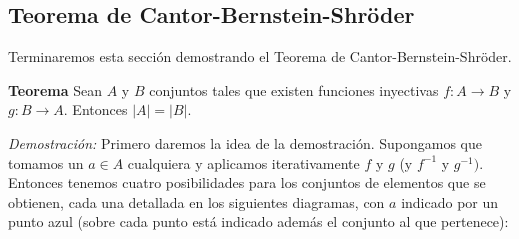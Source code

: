 \subsection*{Teorema de Cantor-Bernstein-Shr\"oder}

Terminaremos esta sección demostrando el Teorema de Cantor-Bernstein-Shr\"oder.

{\bf Teorema}\; 
Sean $A$ y $B$ conjuntos tales que existen funciones inyectivas $f:A\to B$ y $g:B\to A$.
Entonces $|A|=|B|$.
\bigskip

{\it Demostración:}
Primero daremos la idea de la demostración. 
Supongamos que tomamos un $a\in A$ cualquiera y aplicamos iterativamente $f$ y $g$ (y $f^{-1}$ y $g^{-1})$.
Entonces tenemos cuatro posibilidades para los conjuntos de elementos que se obtienen, cada una detallada
en los siguientes diagramas, con $a$ indicado por un punto azul (sobre cada punto está indicado además el
conjunto al que pertenece):

